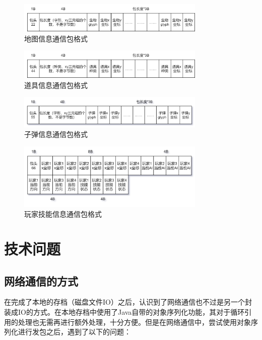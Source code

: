\documentclass{SCIS2022cn}
\begin{document}
\begin{figure}[!t]
\centering
\includegraphics*[width=0.8\textwidth]{pics/creaturePackage.png}
\caption{地图信息通信包格式}
\label{fig7}
\end{figure}

\begin{figure}[!t]
\centering
\includegraphics*[width=0.8\textwidth]{pics/bonusPackage.png}
\caption{道具信息通信包格式}
\label{fig8}
\end{figure}

\begin{figure}[!t]
\centering
\includegraphics*[width=0.8\textwidth]{pics/bulletPackage.png}
\caption{子弹信息通信包格式}
\label{fig9}
\end{figure}

\begin{figure}[!t]
\centering
\includegraphics*[width=0.8\textwidth]{pics/skillPackage.png}
\caption{玩家技能信息通信包格式}
\label{fig10}
\end{figure}

\section{技术问题}
\subsection{网络通信的方式}
在完成了本地的存档（磁盘文件IO）之后，认识到了网络通信也不过是另一个封装成IO的方式。在本地存档中使用了Java自带的对象序列化功能，其对于循环引用的处理也无需再进行额外处理，十分方便。但是在网络通信中，尝试使用对象序列化进行发包之后，遇到了以下的问题：
\end{document}
